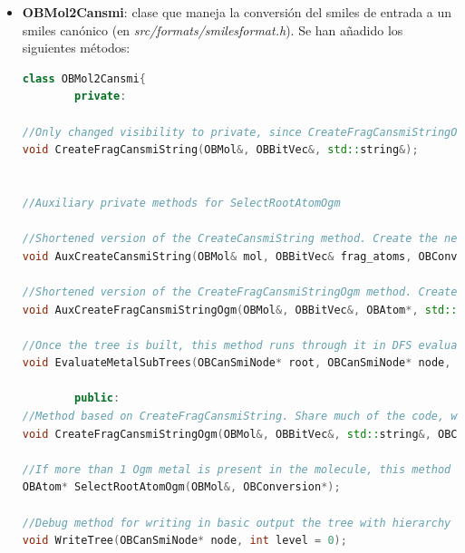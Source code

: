\begin{itemize}
    \item \textbf{OBMol2Cansmi}: clase que maneja la conversión del smiles de entrada a un smiles canónico (en \textit{src/formats/smilesformat.h}). Se han añadido los siguientes métodos:
    \begin{lstlisting}[language=C++]
class OBMol2Cansmi{
        private: 
    
//Only changed visibility to private, since CreateFragCansmiStringOgm was created. Selects the "root" atom, which will be first in the SMILES, then builds a tree in canonical order, and finally generates the SMILES.
void CreateFragCansmiString(OBMol&, OBBitVec&, std::string&);

    
//Auxiliary private methods for SelectRootAtomOgm

//Shortened version of the CreateCansmiString method. Create the necessary variables to call AuxCreateFragCansmiStringOgm.
void AuxCreateCansmiString(OBMol& mol, OBBitVec& frag_atoms, OBConversion* pConv, OBAtom* startatom, std::vector<SubTreeSizes*>& subtreeSizes, std::vector<OBAtom*> ogmAtoms);

//Shortened version of the CreateFragCansmiStringOgm method. Create the necessary variables to build a new canonical tree using as root @p startAtom
void AuxCreateFragCansmiStringOgm(OBMol&, OBBitVec&, OBAtom*, std::vector<SubTreeSizes*>&, std::vector<OBAtom*>);

//Once the tree is built, this method runs through it in DFS evaluating the subtrees hanging from the other ogm metals. Use the auxiliary struct SubTreeSizes for this. 
void EvaluateMetalSubTrees(OBCanSmiNode* root, OBCanSmiNode* node, std::vector<SubTreeSizes*>&, std::vector<OBAtom*>&, std::vector<int>&);

        public: 
//Method based on CreateFragCansmiString. Share much of the code, with some additional methods specifically for my own canonical form designed for organometallic molecules.
void CreateFragCansmiStringOgm(OBMol&, OBBitVec&, std::string&, OBConversion*);

//If more than 1 Ogm metal is present in the molecule, this method chooses one of them, based on some rules and the conectivity of the metal within the molecule and the rest of the atoms
OBAtom* SelectRootAtomOgm(OBMol&, OBConversion*);

//Debug method for writing in basic output the tree with hierarchy formating
void WriteTree(OBCanSmiNode* node, int level = 0);


\end{lstlisting}
\end{itemize}

